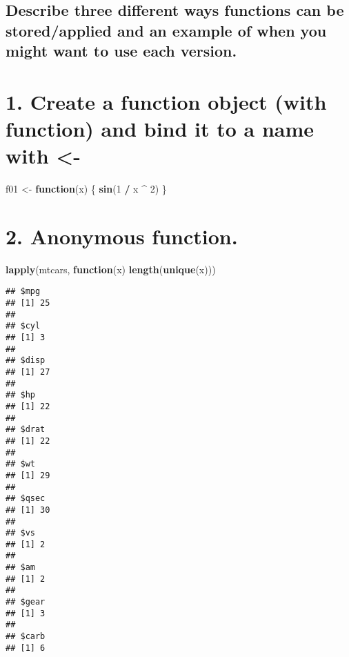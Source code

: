 \documentclass[
]{article}
\newenvironment{Shaded}{\begin{snugshade}}{\end{snugshade}}
\newcommand{\ControlFlowTok}[1]{\textcolor[rgb]{0.13,0.29,0.53}{\textbf{#1}}}
\newcommand{\DecValTok}[1]{\textcolor[rgb]{0.00,0.00,0.81}{#1}}
\newcommand{\KeywordTok}[1]{\textcolor[rgb]{0.13,0.29,0.53}{\textbf{#1}}}
\newcommand{\NormalTok}[1]{#1}
\newcommand{\OperatorTok}[1]{\textcolor[rgb]{0.81,0.36,0.00}{\textbf{#1}}}
\newcommand{\StringTok}[1]{\textcolor[rgb]{0.31,0.60,0.02}{#1}}
\begin{document}
\hypertarget{describe-three-different-ways-functions-can-be-storedapplied-and-an-example-of-when-you-might-want-to-use-each-version.}{%
\subsection{Describe three different ways functions can be
stored/applied and an example of when you might want to use each
version.}\label{describe-three-different-ways-functions-can-be-storedapplied-and-an-example-of-when-you-might-want-to-use-each-version.}}

\hypertarget{create-a-function-object-with-function-and-bind-it-to-a-name-with--}{%
\section{1. Create a function object (with function) and bind it to a
name with
\textless-}\label{create-a-function-object-with-function-and-bind-it-to-a-name-with--}}

\begin{Shaded}
\begin{Highlighting}[]
\NormalTok{f01 <-}\StringTok{ }\ControlFlowTok{function}\NormalTok{(x) \{}
  \KeywordTok{sin}\NormalTok{(}\DecValTok{1} \OperatorTok{/}\StringTok{ }\NormalTok{x }\OperatorTok{^}\StringTok{ }\DecValTok{2}\NormalTok{)}
\NormalTok{\}}
\end{Highlighting}
\end{Shaded}

\hypertarget{anonymous-function.}{%
\section{2. Anonymous function.}\label{anonymous-function.}}

\begin{Shaded}
\begin{Highlighting}[]
\KeywordTok{lapply}\NormalTok{(mtcars, }\ControlFlowTok{function}\NormalTok{(x) }\KeywordTok{length}\NormalTok{(}\KeywordTok{unique}\NormalTok{(x)))}
\end{Highlighting}
\end{Shaded}

\begin{verbatim}
## $mpg
## [1] 25
## 
## $cyl
## [1] 3
## 
## $disp
## [1] 27
## 
## $hp
## [1] 22
## 
## $drat
## [1] 22
## 
## $wt
## [1] 29
## 
## $qsec
## [1] 30
## 
## $vs
## [1] 2
## 
## $am
## [1] 2
## 
## $gear
## [1] 3
## 
## $carb
## [1] 6
\end{verbatim}
\end{document}
